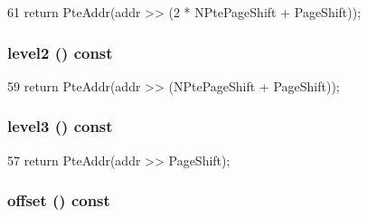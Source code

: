 \begin{DoxyCode}
61     { return PteAddr(addr >> (2 * NPtePageShift + PageShift)); }
\end{DoxyCode}
\hypertarget{structAlphaISA_1_1VAddr_a5fb0a2faeaa59b4d186256f71f494020}{
\subsubsection[{level2}]{ level2 () const}}
\label{structAlphaISA_1_1VAddr_a5fb0a2faeaa59b4d186256f71f494020}



\begin{DoxyCode}
59     { return PteAddr(addr >> (NPtePageShift + PageShift)); }
\end{DoxyCode}
\hypertarget{structAlphaISA_1_1VAddr_a4ea534e4bdbdfebe2d82eddb86284b5d}{
\subsubsection[{level3}]{ level3 () const}}
\label{structAlphaISA_1_1VAddr_a4ea534e4bdbdfebe2d82eddb86284b5d}



\begin{DoxyCode}
57     { return PteAddr(addr >> PageShift); }
\end{DoxyCode}
\hypertarget{structAlphaISA_1_1VAddr_ad7614ecd306d0a915379cd6fae8b02de}{
\subsubsection[{offset}]{ offset () const}}
\label{structAlphaISA_1_1VAddr_ad7614ecd306d0a915379cd6fae8b02de}



